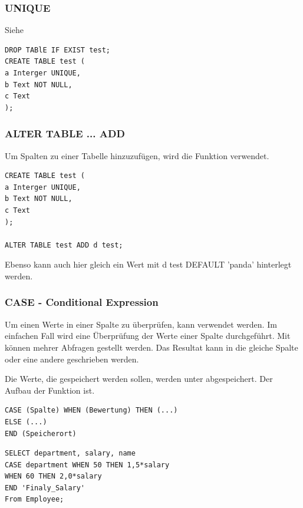 \subsubsection{UNIQUE}
Siehe 

\begin{lstlisting}[style=SQL]
DROP TABlE IF EXIST test;
CREATE TABLE test (
a Interger UNIQUE,
b Text NOT NULL,
c Text
);
\end{lstlisting}

\subsubsection{ALTER TABLE ... ADD}
Um Spalten zu einer Tabelle hinzuzufügen, wird die  Funktion verwendet.

\begin{lstlisting}[style=SQL]
CREATE TABLE test (
a Interger UNIQUE,
b Text NOT NULL,
c Text
);

ALTER TABLE test ADD d test;
\end{lstlisting}
Ebenso kann auch hier gleich ein  Wert mit  d test DEFAULT 'panda' hinterlegt werden.

\subsubsection{CASE - Conditional Expression}
Um einen Werte in einer Spalte zu überprüfen, kann  verwendet werden.
Im einfachen Fall wird eine Überprüfung der Werte einer Spalte durchgeführt. Mit  können mehrer Abfragen gestellt werden. Das Resultat kann in die gleiche Spalte oder eine andere geschrieben werden.

Die Werte, die gespeichert werden sollen, werden unter  abgespeichert.
Der Aufbau der Funktion ist.

\begin{lstlisting}[style=SQL]
CASE (Spalte) WHEN (Bewertung) THEN (...)
ELSE (...)
END (Speicherort)
\end{lstlisting}

\begin{lstlisting}[style=SQL]
SELECT department, salary, name
CASE department WHEN 50 THEN 1,5*salary
WHEN 60 THEN 2,0*salary
END 'Finaly_Salary' 
From Employee;
\end{lstlisting}

